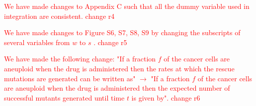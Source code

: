 \documentclass[12pt]{extarticle}
\begin{document}
\textcolor{red}{We have made changes to Appendix C such that all the dummy variable used in integration are consistent. change r4} 

\textcolor{red}{We have made changes to Figure S6, S7, S8, S9 by changing the subscripts of several variables from $w$ to $s$ . change r5} 

\textcolor{red}{ We have made the following change: "If a fraction $f$ of the cancer cells are aneuploid when the drug is administered then the rates at which the rescue mutations are generated can be written as" $\rightarrow$
"If a fraction $f$ of the cancer cells are aneuploid when the drug is administered then the expected number of successful mutants generated until time $t$ is given by". change r6} 




\end{document}
